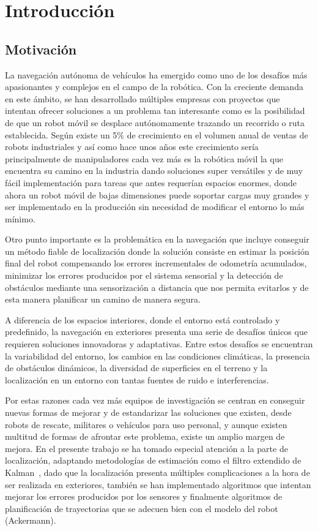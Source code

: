 \chapter{Introducción}

\section{Motivación}

\noindent 

La navegación autónoma de vehículos ha emergido como uno de los desafíos más apasionantes y complejos en el campo de la robótica. 
Con la creciente demanda en este ámbito, se han desarrollado múltiples empresas con proyectos que intentan ofrecer soluciones a un 
problema tan interesante como es la posibilidad de que un robot móvil se desplace autónomamente trazando un recorrido o ruta establecida. 
Según\cite{IFR23} existe un 5\% de crecimiento en el volumen anual de ventas de robots industriales y así como hace unos años este crecimiento 
sería principalmente de manipuladores cada vez más es la robótica móvil la que encuentra su camino en la industria dando soluciones super versátiles y de muy fácil 
implementación para tareas que antes requerían espacios enormes, donde ahora un robot móvil de bajas dimensiones puede soportar cargas muy grandes 
y ser implementado en la producción sin necesidad de modificar el entorno lo más mínimo. 

Otro punto importante es la problemática en la navegación que incluye conseguir un método fiable de localización donde la solución consiste en estimar la posición final del
robot compensando los errores incrementales de odometría acumulados, minimizar los errores producidos por el sistema sensorial y la detección de 
obstáculos mediante una sensorización a distancia que nos permita evitarlos y de esta manera planificar un camino de manera segura.

A diferencia de los espacios interiores, donde el entorno está controlado y predefinido, la navegación en exteriores presenta una serie de 
desafíos únicos que requieren soluciones innovadoras y adaptativas. Entre estos desafíos se encuentran la variabilidad del entorno, los 
cambios en las condiciones climáticas, la presencia de obstáculos dinámicos, la diversidad de superficies en el terreno y la localización 
en un entorno con tantas fuentes de ruido e interferencias.


Por estas razones cada vez más equipos de investigación se centran en conseguir nuevas formas de mejorar y de estandarizar las soluciones 
que existen, desde robots de rescate, militares o vehículos para uso personal, y aunque existen multitud de formas de afrontar este 
problema, existe un amplio margen de mejora. En el presente trabajo se ha tomado especial atención a la parte de localización,
adaptando metodologías de estimación como el filtro extendido de Kalman~\Cite{Rolan20}, dado que la localización presenta múltiples complicaciones a la hora de
 ser realizada en exteriores, también se han implementado algoritmos que intentan mejorar los errores producidos por los sensores y
finalmente algoritmos de planificación de trayectorias que se adecuen bien con el modelo del robot (Ackermann).

